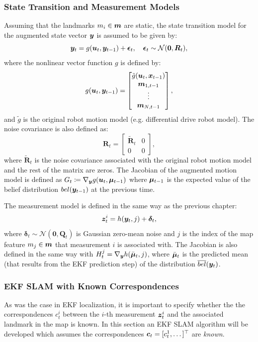 \subsubsection{State Transition and Measurement Models}
Assuming that the landmarks $m_i \in \bm{m}$ are static, the state transition model for the augmented state vector $\bm{y}$ is assumed to be given by:
\begin{equation*}
    \bm{y}_t = g(\bm{u}_t, \bm{y}_{t-1}) + \bm{\epsilon}_t, \quad \bm{\epsilon}_t \sim \mathcal{N}(\bm{0},\bm{R}_t),
\end{equation*}
where the nonlinear vector function $g$ is defined by:
\begin{equation*}
g(\bm{u}_t, \bm{y}_{t-1}) = \begin{bmatrix}
\tilde{g}(\bm{u}_t, \bm{x}_{t-1}) \\ \bm{m}_{1,t-1} \\ \vdots \\ \bm{m}_{N,t-1}
\end{bmatrix},
\end{equation*}
and $\tilde{g}$ is the original robot motion model (e.g. differential drive robot model). The noise covariance is also defined as:
\begin{equation*}
\bm{R}_t = \begin{bmatrix}
\tilde{\bm{R}}_t & 0 \\
0 & 0
\end{bmatrix},
\end{equation*}
where $\tilde{\bm{R}}_t$ is the noise covariance associated with the original robot motion model and the rest of the matrix are zeros.
The Jacobian of the augmented motion model is defined as $G_t \coloneqq \nabla_{\bm{y}} g(\bm{u}_t, \bm{\mu}_{t-1})$ where $\bm{\mu}_{t-1}$ is the expected value of the belief distribution $bel(\bm{y}_{t-1})$ at the previous time.

The measurement model is defined in the same way as the previous chapter:
\begin{equation*}
\bm{z}^i_t = h(\bm{y}_t, j) + \bm{\delta}_t,
\end{equation*}
where $\bm{\delta}_t \sim \mathcal{N}(\bm{0}, \bm{Q}_t)$ is Gaussian zero-mean noise and $j$ is the index of the map feature $m_j \in \bm{m}$ that measurement $i$ is associated with. The Jacobian is also defined in the same way with $H^{j}_t = \nabla_{\bm{y}}h(\bar{\bm{\mu}}_t,j)$, where $\bar{\bm{\mu}}_t$ is the predicted mean (that results from the EKF prediction step) of the distribution $\overline{bel}(\bm{y}_t)$.

\subsubsection{EKF SLAM with Known Correspondences}
As was the case in EKF localization, it is important to specify whether the the correspondences $c_t^i$ between the $i$-th measurement $\bm{z}_t^i$ and the associated landmark in the map is known. In this section an EKF SLAM algorithm will be developed which assumes the correspondences $\bm{c}_t = [c_t^1, \dots ]^\top $ are \textit{known}. 



